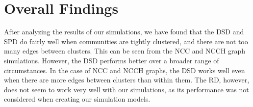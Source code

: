 \section{Overall Findings}
After analyzing the results of our simulations, we have found that the DSD
and SPD do fairly well when communities are tightly clustered, and there 
are not too many edges between clusters. This can be seen from the NCC and
NCCH graph simulations. However, the DSD performs better over a broader
range of circumstances. In the case of NCC and NCCH graphs, the DSD works
well even when there are more edges between clusters than within them. The
RD, however, does not seem to work very well with our simulations, as its
performance was not considered when creating our simulation models.